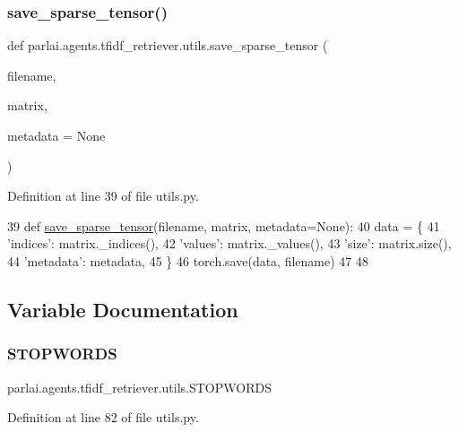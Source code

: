 \subsubsection{\texorpdfstring{save\+\_\+sparse\+\_\+tensor()}{save\_sparse\_tensor()}}
{\footnotesize\ttfamily def parlai.\+agents.\+tfidf\+\_\+retriever.\+utils.\+save\+\_\+sparse\+\_\+tensor (\begin{DoxyParamCaption}\item[{}]{filename,  }\item[{}]{matrix,  }\item[{}]{metadata = {\ttfamily None} }\end{DoxyParamCaption})}



Definition at line 39 of file utils.\+py.


\begin{DoxyCode}
39 \textcolor{keyword}{def }\hyperlink{namespaceparlai_1_1agents_1_1tfidf__retriever_1_1utils_a6d1c2b31f2a5d432d7cb677f436e17c0}{save\_sparse\_tensor}(filename, matrix, metadata=None):
40     data = \{
41         \textcolor{stringliteral}{'indices'}: matrix.\_indices(),
42         \textcolor{stringliteral}{'values'}: matrix.\_values(),
43         \textcolor{stringliteral}{'size'}: matrix.size(),
44         \textcolor{stringliteral}{'metadata'}: metadata,
45     \}
46     torch.save(data, filename)
47 
48 
\end{DoxyCode}


\subsection{Variable Documentation}
\mbox{\label{namespaceparlai_1_1agents_1_1tfidf__retriever_1_1utils_a6dcd89ee7dccc9b5dc3ffc8544029c89}} 
\subsubsection{\texorpdfstring{S\+T\+O\+P\+W\+O\+R\+DS}{STOPWORDS}}
{\footnotesize\ttfamily parlai.\+agents.\+tfidf\+\_\+retriever.\+utils.\+S\+T\+O\+P\+W\+O\+R\+DS}



Definition at line 82 of file utils.\+py.

